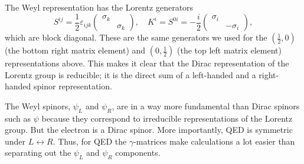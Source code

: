 \documentclass[11pt]{article}
\theoremstyle{definition}
\begin{document}
The Weyl representation has the Lorentz generators
\begin{equation}
    S^{ij} = \frac{1}{2}
    \varepsilon_{ijk}
    \begin{pmatrix}
        \sigma_k & \\
        & \sigma_k
    \end{pmatrix},
    \quad
    K^i = S^{0i} = -\frac{i}{2}
    \begin{pmatrix}
        \sigma_i &\\
        & -\sigma_i
    \end{pmatrix},
\end{equation}
which are block diagonal. These are the same generators we used for the $(\frac{1}{2},0)$ (the bottom right matrix element) and $(0,\frac{1}{2})$ (the top left matrix element) representations above. This makes it clear that the Dirac representation of the Lorentz group is reducible; it is the direct sum of a left-handed and a right-handed spinor representation.

The Weyl spinors, \(\psi_L\) and \(\psi_R\), are in a way more fundamental than Dirac spinors such as \(\psi\) because they correspond to irreducible representations of the Lorentz group. But the electron is a Dirac spinor. More importantly, QED is symmetric under \(L \leftrightarrow R\). Thus, for QED the \(\gamma\)-matrices make calculations a lot easier than separating out the \(\psi_L\) and \(\psi_R\) components.
\end{document}
